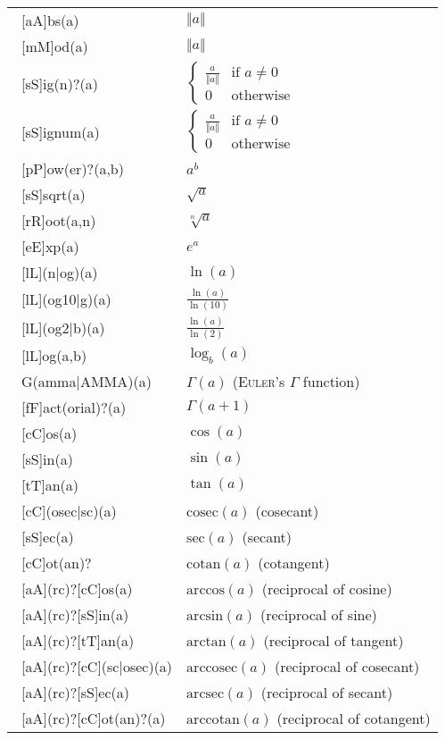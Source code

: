 \begin{longtable}{ll}
    \endlastfoot
    \ [aA]bs(a) & $\Vert a \Vert$\\
    \ [mM]od(a) & $\Vert a \Vert$\\
    \ [sS]ig(n)?(a) & $\begin{cases}\frac{a}{\Vert a \Vert} & \text{if }a\neq 0\\0&\text{otherwise}\end{cases}$\\
    \ [sS]ignum(a) & $\begin{cases}\frac{a}{\Vert a \Vert} & \text{if }a\neq 0\\0&\text{otherwise}\end{cases}$\\
    \ [pP]ow(er)?(a,b) & $a^b$\\
    \ [sS]sqrt(a) & $\sqrt{a}$\\
    \ [rR]oot(a,n) & $\sqrt[n]{a}$\\
    \ [eE]xp(a) & $e^a$\\
    \ [lL](n|og)(a)& $\ln(a)$\\
    \ [lL](og10|g)(a)& $\frac{\ln(a)}{\ln(10)}$\\
    \ [lL](og2|b)(a)& $\frac{\ln(a)}{\ln(2)}$\\
    \ [lL]og(a,b)& $\log_b(a)$\\
    \ G(amma|AMMA)(a)& $\Gamma(a)$ (\textsc{Euler}'s $\Gamma$ function)\\
    \ [fF]act(orial)?(a)& $\Gamma(a+1)$\\
    \ [cC]os(a)& $\cos(a)$\\
    \ [sS]in(a)& $\sin(a)$\\
    \ [tT]an(a)& $\tan(a)$\\
    \ [cC](osec|sc)(a)& $\mathrm{cosec}(a)$ (cosecant)\\
    \ [sS]ec(a)& $\mathrm{sec}(a)$ (secant)\\
    \ [cC]ot(an)? & $\mathrm{cotan}(a)$ (cotangent)\\
    \ [aA](rc)?[cC]os(a) & $\mathrm{arccos}(a)$ (reciprocal of cosine)\\
    \ [aA](rc)?[sS]in(a) & $\mathrm{arcsin}(a)$ (reciprocal of sine)\\
    \ [aA](rc)?[tT]an(a) & $\mathrm{arctan}(a)$ (reciprocal of tangent)\\
    \ [aA](rc)?[cC](sc|osec)(a) & $\mathrm{arccosec}(a)$ (reciprocal of cosecant)\\
    \ [aA](rc)?[sS]ec(a) & $\mathrm{arcsec}(a)$ (reciprocal of secant)\\
    \ [aA](rc)?[cC]ot(an)?(a) & $\mathrm{arccotan}(a)$ (reciprocal of cotangent)\\

\end{longtable}
